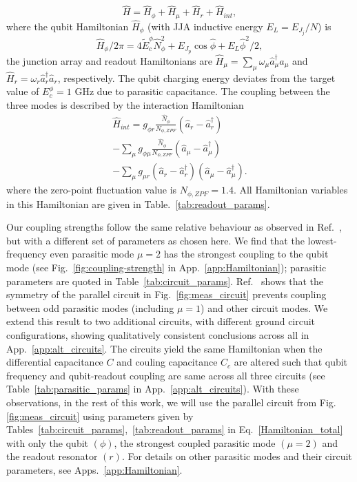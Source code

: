 \documentclass[%
reprint,
superscriptaddress,
 amsmath,amssymb,
 aps,
 prx,
longbibliography,
floatfix,
]{revtex4-2}
\begin{document}
\begin{equation}
   \hat H =\hat{H}_\phi + \hat{H}_\mu + \hat{H}_r + \hat{H}_{int},\label{Hamiltonian_total}
\end{equation}
where the qubit Hamiltonian $\hat{H}_\phi$ (with JJA inductive energy $E_L=E_{J_j}/N$) is 
\begin{equation}
\hat{H}_\phi / 2\pi = 4\tilde{E}^\phi_c \hat N_\phi^2+ E_{J_p}\cos{\hat\phi}+E_L\hat \phi^2 /2,
\end{equation}
the junction array and readout Hamiltonians are $\hat{H}_\mu = \sum_{\mu}\omega_\mu \hat a_\mu^\dagger \hat a_\mu$ and $\hat{H}_r = \omega_r \hat a_r^\dagger \hat a_r$, respectively. The qubit charging energy deviates from the target value of $E_c^{\phi}=1$ GHz due to parasitic capacitance. The coupling between the three modes is described by the interaction Hamiltonian
\begin{align}\label{eq:int_hamiltonian}
\hat{H}_{int} = g_{\phi r} \frac{\hat N_\phi}{{N_{\phi,ZPF}}} (\hat a_r-\hat a_r^\dagger)\nonumber \\ -\sum_{\mu} g_{\phi\mu} \frac{\hat N_\phi}{{N_{\phi,ZPF}}} (\hat a_\mu-\hat a_\mu^\dagger) \nonumber \\- \sum_{\mu} g_{\mu r} (\hat a_r-\hat a_r^\dagger)(\hat a_\mu-\hat a_\mu^\dagger).
\end{align}
where the zero-point fluctuation value is $N_{\phi,ZPF}=1.4$. All Hamiltonian variables in this Hamiltonian are given in Table.~\ref{tab:readout_params}.


 Our coupling strengths follow the same relative behaviour as observed in Ref.~\cite{viola2015collective}, but with a different set of parameters as chosen here. We find that the lowest-frequency even parasitic mode $\mu=2$ has the strongest coupling to the qubit mode (see Fig.~\ref{fig:coupling-strength} in App.~\ref{app:Hamiltonian}); parasitic parameters are quoted in Table~\ref{tab:circuit_params}. Ref.~\cite{viola2015collective} shows that the symmetry of the parallel circuit in Fig.~\ref{fig:meas_circuit} prevents coupling between odd parasitic modes (including $\mu=1$) and other circuit modes. We extend this result to two additional circuits, with different ground circuit configurations, showing qualitatively consistent conclusions across all in App.~\ref{app:alt_circuits}. The circuits yield the same Hamiltonian when the differential capacitance $C$ and couling capacitance $C_c$ are altered such that qubit frequency and qubit-readout coupling are same across all three circuits (see Table~\ref{tab:parasitic_params} in App.~\ref{app:alt_circuits}). With these observations, in the rest of this work, we will use the parallel circuit from Fig.\ref{fig:meas_circuit} using parameters given by Tables~\ref{tab:circuit_params},~\ref{tab:readout_params} in Eq.~\ref{Hamiltonian_total} with only the qubit $(\phi)$, the strongest coupled parasitic mode $(\mu=2)$ and the readout resonator $(r)$. For details on other parasitic modes and their circuit parameters, see Apps.~\ref{app:Hamiltonian}. 
 
\end{document}
